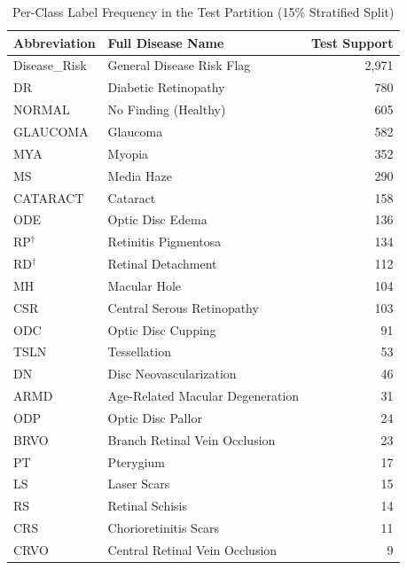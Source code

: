 \documentclass[conference]{IEEEtran}
\begin{document}
\begin{table}[htbp]
\centering
\caption{Per-Class Label Frequency in the Test Partition (15\% Stratified Split)}
\label{tab:class_freq}
\setlength{\tabcolsep}{4pt}
\begin{tabular}{llr}
\toprule
Abbreviation & Full Disease Name & Test Support \\
\midrule
Disease\_Risk & General Disease Risk Flag        & 2,971 \\
DR            & Diabetic Retinopathy              &   780 \\
NORMAL        & No Finding (Healthy)              &   605 \\
GLAUCOMA      & Glaucoma                          &   582 \\
MYA           & Myopia                            &   352 \\
MS            & Media Haze                        &   290 \\
CATARACT      & Cataract                          &   158 \\
ODE           & Optic Disc Edema                  &   136 \\
RP$^\dagger$  & Retinitis Pigmentosa              &   134 \\
RD$^\dagger$  & Retinal Detachment                &   112 \\
MH            & Macular Hole                      &   104 \\
CSR           & Central Serous Retinopathy        &   103 \\
ODC           & Optic Disc Cupping                &    91 \\
TSLN          & Tessellation                      &    53 \\
DN            & Disc Neovascularization           &    46 \\
ARMD          & Age-Related Macular Degeneration  &    31 \\
ODP           & Optic Disc Pallor                 &    24 \\
BRVO          & Branch Retinal Vein Occlusion     &    23 \\
PT            & Pterygium                         &    17 \\
LS            & Laser Scars                       &    15 \\
RS            & Retinal Schisis                   &    14 \\
CRS           & Chorioretinitis Scars             &    11 \\
CRVO          & Central Retinal Vein Occlusion    &     9 \\

\end{tabular}
\end{table}
\end{document}
